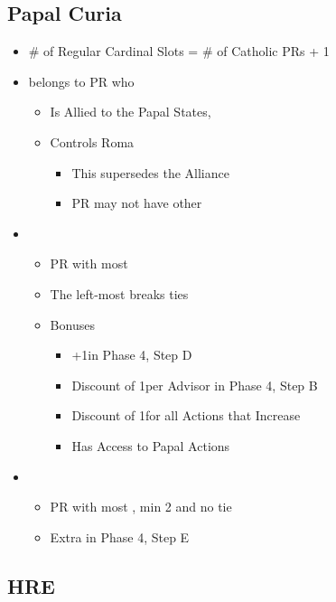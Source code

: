 \documentclass[10pt]{article}
\begin{document}
\subsection*{Papal Curia }
\begin{itemize}
	\item \# of Regular Cardinal Slots = \# of Catholic PRs + 1
	\item {} belongs to PR who
	\begin{itemize}
		\item Is Allied to the \guilsinglright Papal States, 
		\item Controls Roma
		\begin{itemize}
			\item This supersedes the Alliance
			\item PR may not have other \cardinals
		\end{itemize}
	\end{itemize}
	\item {}
	\begin{itemize}
		\item PR with most \cardinals
		\item The left-most \cardinal breaks ties
		\item Bonuses
		\begin{itemize}
			\item +1\diplopower in Phase 4, Step D
			\item Discount of 1\ducat per Advisor in Phase 4, Step B
			\item Discount of 1\adminpower for all Actions that Increase \stability
			\item Has Access to Papal Actions
		\end{itemize}
	\end{itemize}
	\item {}
	\begin{itemize}
		\item PR with most \cardinals, min 2 and no tie
		\item Extra \prestige in Phase 4, Step E
	\end{itemize}
\end{itemize}

\subsection*{HRE }
\end{document}
